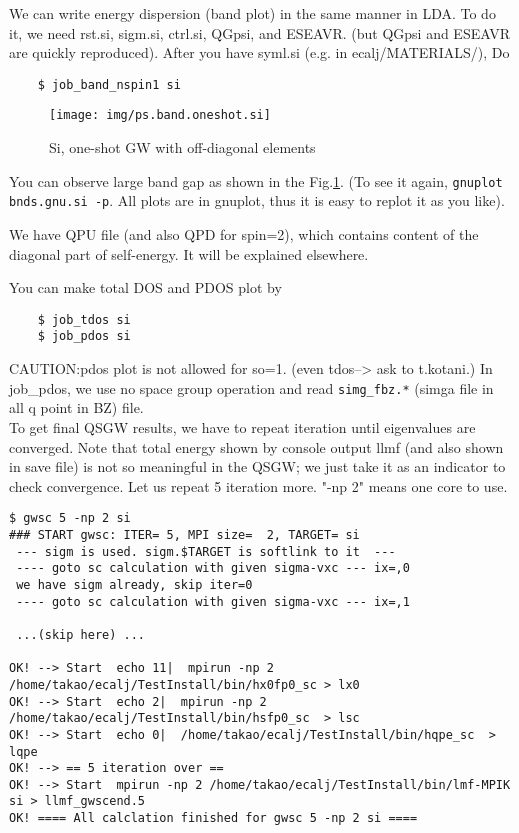 \documentclass[a4paper,10pt,epsf,fleqn]{article}
\begin{document}
We can write energy dispersion (band plot) in the same manner in LDA.
To do it, we need rst.si, sigm.si, ctrl.si, QGpsi, and ESEAVR.
(but QGpsi and ESEAVR are quickly reproduced). After you have syml.si
(e.g. in ecalj/MATERIALS/), Do
\begin{verbatim}
    $ job_band_nspin1 si
\end{verbatim}

\begin{figure}[h]
 \begin{center}
  \texttt{[image: img/ps.band.oneshot.si]}
  \caption{Si, one-shot GW with off-diagonal elements}
 \end{center}
\label{sigwscone}
\end{figure}
You can observe large band gap as shown in the Fig.\ref{sigwscone}.
(To see it again, \verb+gnuplot bnds.gnu.si -p+.
All plots are in gnuplot, thus it is easy to replot it as you like).

We have QPU file (and also QPD for spin=2), which contains content
of the diagonal part of self-energy. It will be explained elsewhere.

You can make total DOS and PDOS plot by 
\begin{verbatim}
    $ job_tdos si
    $ job_pdos si
\end{verbatim}
CAUTION:pdos plot is not allowed for so=1. (even tdos--> ask to
t.kotani.) In job\_pdos, we use no space group operation and read
\verb+simg_fbz.*+ (simga file in all q point in BZ) file.
\\

To get final QSGW results, we have to repeat iteration 
until eigenvalues are converged.
Note that total energy shown by console output llmf (and also shown in
save file) is not so meaningful in the QSGW; we just take it as an indicator to check convergence. 
Let us repeat 5 iteration more. "-np 2" means one core to use.
\begin{verbatim}
$ gwsc 5 -np 2 si
### START gwsc: ITER= 5, MPI size=  2, TARGET= si
 --- sigm is used. sigm.$TARGET is softlink to it  ---
 ---- goto sc calculation with given sigma-vxc --- ix=,0
 we have sigm already, skip iter=0
 ---- goto sc calculation with given sigma-vxc --- ix=,1

 ...(skip here) ...

OK! --> Start  echo 11|  mpirun -np 2 /home/takao/ecalj/TestInstall/bin/hx0fp0_sc > lx0 
OK! --> Start  echo 2|  mpirun -np 2 /home/takao/ecalj/TestInstall/bin/hsfp0_sc  > lsc 
OK! --> Start  echo 0|  /home/takao/ecalj/TestInstall/bin/hqpe_sc  > lqpe 
OK! --> == 5 iteration over ==
OK! --> Start  mpirun -np 2 /home/takao/ecalj/TestInstall/bin/lmf-MPIK  si > llmf_gwscend.5 
OK! ==== All calclation finished for gwsc 5 -np 2 si ====
\end{verbatim}
\end{document}
